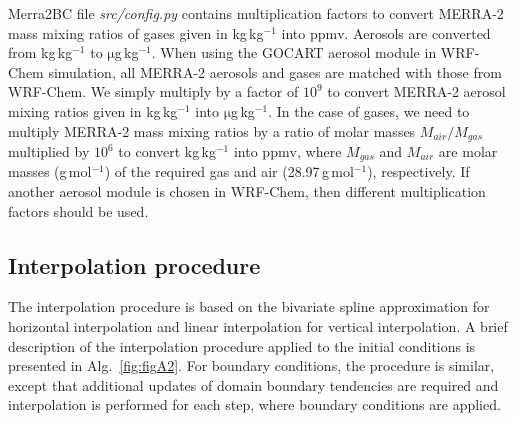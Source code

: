 \documentclass{article}
\newcommand{\unit}[1]{\ensuremath{\mathrm{#1}}}
\begin{document}
{Merra2BC} file \textit{src/config.py} contains multiplication factors to convert MERRA-2 mass mixing ratios of gases given in kg\,kg$^{-1}$ into \unit{ppmv}. Aerosols are converted from kg\,kg$^{-1}$ to \unit{\mu}g\,kg$^{-1}$. When using the GOCART aerosol module in WRF-Chem simulation, all MERRA-2 aerosols and gases are matched with those from WRF-Chem. We simply multiply by a factor of $10^9$ to convert MERRA-2 aerosol mixing ratios given in kg\,kg$^{-1}$ into \unit{\mu}g\,kg$^{-1}$. In the case of gases, we need to multiply MERRA-2 mass mixing ratios by a ratio of molar masses $M_{air}/M_{gas}$ multiplied by $10^6$ to convert kg\,kg$^{-1}$ into \unit{ppmv}, where $M_{gas}$ and $M_{air}$ are molar masses (g\,mol$^{-1}$) of the required gas and air (28.97\,g\,mol$^{-1}$), respectively. If another aerosol module is chosen in WRF-Chem, then different multiplication factors should be used.

\subsection{Interpolation procedure}
The interpolation procedure is based on the bivariate spline approximation for horizontal interpolation and linear interpolation for vertical interpolation.
A brief description of the interpolation procedure applied to the initial conditions is presented in Alg.~\ref{fig:figA2}. For boundary conditions, the procedure is similar, except that additional updates of domain boundary tendencies are required and interpolation is performed for each step, where boundary conditions are applied.
\end{document}
